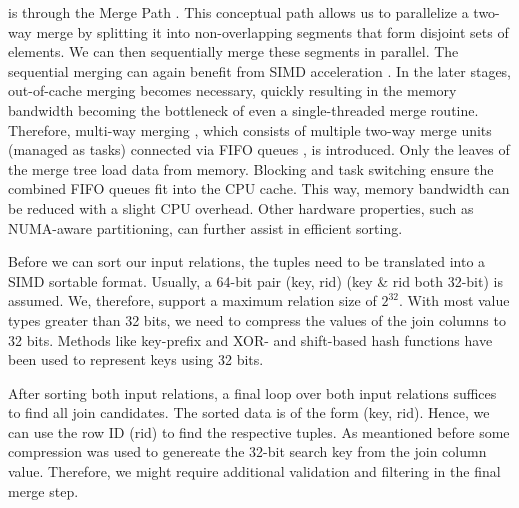is through the Merge Path \cite{MergePath}. This conceptual path allows us to parallelize a two-way merge by splitting
it into non-overlapping segments that form disjoint sets of elements. We can then sequentially
merge these segments in parallel. The sequential merging can again benefit from SIMD acceleration \cite{Watkins}.
In the later stages, out-of-cache merging becomes necessary, quickly resulting in the memory
bandwidth becoming the bottleneck of even a single-threaded merge routine. Therefore, multi-way
merging \cite{Balkesen}, which consists of multiple two-way merge units (managed as tasks) connected via FIFO queues
, is introduced. Only the leaves of the merge tree load data from memory. Blocking and task switching 
ensure the combined FIFO queues fit into the CPU cache. This way, memory bandwidth can be reduced
with a slight CPU overhead. Other hardware properties, such as NUMA-aware partitioning, can further
assist in efficient sorting.

Before we can sort our input relations, the tuples need to be translated into a SIMD sortable
format. Usually, a 64-bit pair (key, rid) (key \& rid both 32-bit) is assumed. We, therefore,
support a maximum relation size of $2^{32}$. With most value types greater
than 32 bits, we need to compress the values of the join columns to 32 bits. Methods like 
key-prefix \cite{chris_nyberg__1994} and XOR- and shift-based hash functions \cite{1319989} have 
been used to represent keys using 32 bits.

After sorting both input relations, a final loop over both input relations suffices to find all
join candidates. The sorted data is of the form (key, rid). Hence, we can use the row ID (rid) to
find the respective tuples. As meantioned before some compression was used to genereate the 32-bit
search key from the join column value. Therefore, we might require additional validation and 
filtering in the final merge step.
